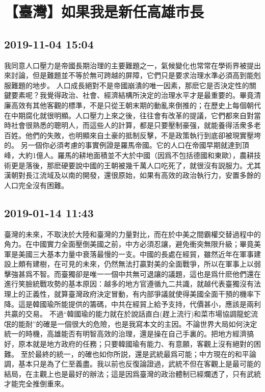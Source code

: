\documentclass[twocolumn]{ctexart}
\begin{document}
\section*{【臺灣】如果我是新任高雄市長}
\subsection*{2019-11-04 15:04}

我同意人口壓力是帝國長期治理的主要難題之一，氣候變化也常常在學術界被提出來討論，但是難題並不等於無可跨越的屏障，它們只是要求治理水準必須高到能剋服難題的地步。
人口成長絕對不是帝國崩潰的唯一因素，那麽它是否決定性的關鍵要素呢？我覺得政治、社會、經濟結構所決定的治理水平才是最重要的。畢竟清廉高效有其他客觀的標準，不是只從王朝末期的動亂來倒推的；在歷史上每個朝代在中期腐化就很明顯。人口壓力上來之後，往往會有改革的提議，它們都來自對當時社會很熟悉的聰明人，而這些人的計算，都是只要壓制豪强，就能養得活衆多老百姓。他們的失敗，也明顯來自土豪的抵制反擊，不是政策執行到底卻被現實壓垮的。
另一個你必須考慮的事實例證是羅馬帝國。它的人口在帝國早期就達到頂峰，大約1億人。羅馬的耕地面積並不大於中國（因爲不包括德國和東歐），農耕技術更是落後，那麽硬要說中國的王朝被幾千萬人口吃死了，就很沒有説服力。尤其漢朝對長江流域及以南的開發，還很原始，如果有高效的政治執行力，安置多餘的人口完全沒有困難。
\subsection*{2019-01-14 11:43}

臺灣的未來，不取決於大陸和臺灣的力量對比，而在於中美之間霸權交替過程中的角力。在中國實力全面壓倒美國之前，中方必須忍讓，避免衝突無限升級；畢竟美軍是美國三大基本力量中衰落最慢的一支。中國的長處在經貿，雖然近年在軍事建設上頗有建樹，在可見的未來，仍然無法打贏對美的全面戰爭，所以在軍事上以弱擊強甚爲不智。而臺獨卻是唯一一個中共無可退讓的議題，這也是爲什麽他們還在進行笑臉統戰攻勢的基本原因：越多的地方官遵循九二共識，就越代表臺獨沒有法理上的正義性，就算臺灣政府決定冒動，有内部爭議就使得美國全面干預的機率下降。這是韓國瑜所能提供的籌碼，中共在經貿上給予支持，代價甚小，應該是兩利共贏的交易。 
不過“韓國瑜的能力就在於說話直白(趕上流行)和菜市場協調龍蛇流氓的能耐”的確是一個很大的危險，也是我寫本文的主因。不論世界大局如何決定統一的時機，高雄能否有明智高效的治理，還是操在自己手裏的。把地方經濟搞好，原本就是地方政府的任務；只要韓國瑜有能力、有意願，客觀上沒有絕對的困難。 
至於最終的統一，的確也如你所説，還是武統最爲可能；中方現在的和平論調，基本只是為了仁至義盡。我以前也反復論證過，武統不但在客觀上是最可能的結局，在主觀上也是最好的辦法；這是因爲臺灣的政治體制已經爛透了，只有武統才能完全推倒重來。
\end{document}
